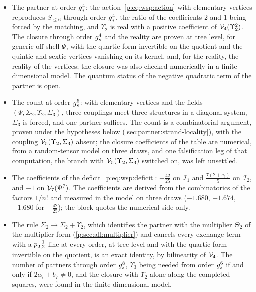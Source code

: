 \begin{itemize}
  \item The partner at order $g_s^4$: the action~\eqref{p:eq:wsp:action} with elementary vertices reproduces $S_{\le 6}$ through order $g_s^4$, the ratio of the coefficients $2$ and $1$ being forced by the matching, and $\Upsilon_2$ is real with a positive coefficient of $\mathcal{V}_{4}(\Upsilon_2^2)$.
    The closure through order $g_s^4$ and the reality are proven at tree level, for generic off-shell $\Psi$, with the quartic form invertible on the quotient and the quintic and sextic vertices vanishing on its kernel, and, for the reality, the reality of the vertices; the closure was also checked numerically in a finite-dimensional model.
    The quantum status of the negative quadratic term of the partner is open.

  \item The count at order $g_s^5$: with elementary vertices and the fields $(\Psi, \Sigma_2, \Upsilon_2, \Sigma_3)$, three couplings meet three structures in a diagonal system, $\Sigma_3$ is forced, and one partner suffices.
    The count is a combinatorial argument, proven under the hypotheses below (\cref{sec:partner:strand-locality}), with the coupling $\mathcal{V}_{5}(\Upsilon_2, \Sigma_3)$ absent; the closure coefficients of the table are numerical, from a random-tensor model on three draws, and one falsification leg of that computation, the branch with $\mathcal{V}_{5}(\Upsilon_2, \Sigma_3)$ switched on, was left unsettled.

  \item The coefficients of the deficit~\eqref{p:eq:wsp:deficit}: $- \frac{42}{25}$ on $\mathcal I_1$ and $\frac{7 (2 + c_6)}{5}$ on $\mathcal I_2$, and $- 1$ on $\mathcal{V}_{7}(\Psi^7)$.
    The coefficients are derived from the combinatorics of the factors $1 / n!$ and measured in the model on three draws ($- 1.680$, $- 1.674$, $- 1.680$ for $- \frac{42}{25}$); the block quotes the numerical side only.

  \item The rule $\Sigma_2 \to \Sigma_2 + \Upsilon_2$, which identifies the partner with the multiplier $\Theta_2$ of the multiplier form (\cref{p:sec:all:multiplier}) and cancels every exchange term with a $p_{2,2}^{-1}$ line at every order, at tree level and with the quartic form invertible on the quotient, is an exact identity, by bilinearity of $\mathcal{V}_{4}$.
    The number of partners through order $g_s^8$, $\Upsilon_3$ being needed from order $g_s^6$ if and only if $2 a_7 + b_7 \neq 0$, and the closure with $\Upsilon_2$ alone along the completed squares, were found in the finite-dimensional model.
\end{itemize}

